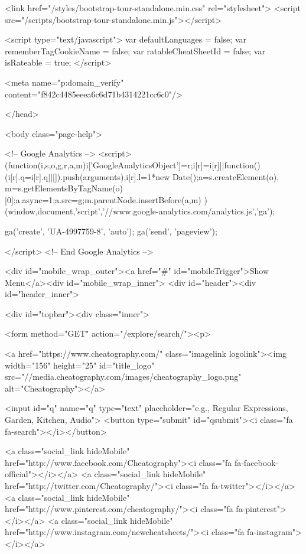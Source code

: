         <link href="/styles/bootstrap-tour-standalone.min.css" rel="stylesheet">
        <script src="/scripts/bootstrap-tour-standalone.min.js"></script>

        <script type="text/javascript">
            var defaultLanguages = false;
            var rememberTagCookieName = false;
            var ratableCheatSheetId = false;
            var isRateable = true;
        </script>

        <meta name="p:domain_verify" content="f842c4485eeea6c6d71b4314221cc6c0"/>

    </head>

<body class="page-help">

    
        <!-- Google Analytics -->
        <script>
        (function(i,s,o,g,r,a,m){i['GoogleAnalyticsObject']=r;i[r]=i[r]||function(){
        (i[r].q=i[r].q||[]).push(arguments)},i[r].l=1*new Date();a=s.createElement(o),
        m=s.getElementsByTagName(o)[0];a.async=1;a.src=g;m.parentNode.insertBefore(a,m)
        })(window,document,'script','//www.google-analytics.com/analytics.js','ga');

        ga('create', 'UA-4997759-8', 'auto');
        ga('send', 'pageview');

        </script>
        <!-- End Google Analytics -->

    
    <div id="mobile_wrap_outer"><a href="#" id="mobileTrigger">Show Menu</a><div id="mobile_wrap_inner">
    <div id="header"><div id="header_inner">


        <div id="topbar"><div class="inner">

            <form method="GET" action="/explore/search/"><p>

            <a href="https://www.cheatography.com/" class="imagelink logolink"><img width="156" height="25" id="title_logo" src="//media.cheatography.com/images/cheatography_logo.png" alt="Cheatography"></a>

            <input id="q" name="q" type="text" placeholder="e.g., Regular Expressions, Garden, Kitchen, Audio"> <button type="submit" id="qsubmit"><i class="fa fa-search"></i></button>

            <a class="social_link hideMobile" href="http://www.facebook.com/Cheatography"><i class="fa fa-facebook-official"></i></a>
            <a class="social_link hideMobile" href="http://twitter.com/Cheatography/"><i class="fa fa-twitter"></i></a>
            <a class="social_link hideMobile" href="http://www.pinterest.com/cheatography/"><i class="fa fa-pinterest"></i></a>
            <a class="social_link hideMobile" href="http://www.instagram.com/newcheatsheets/"><i class="fa fa-instagram"></i></a>

